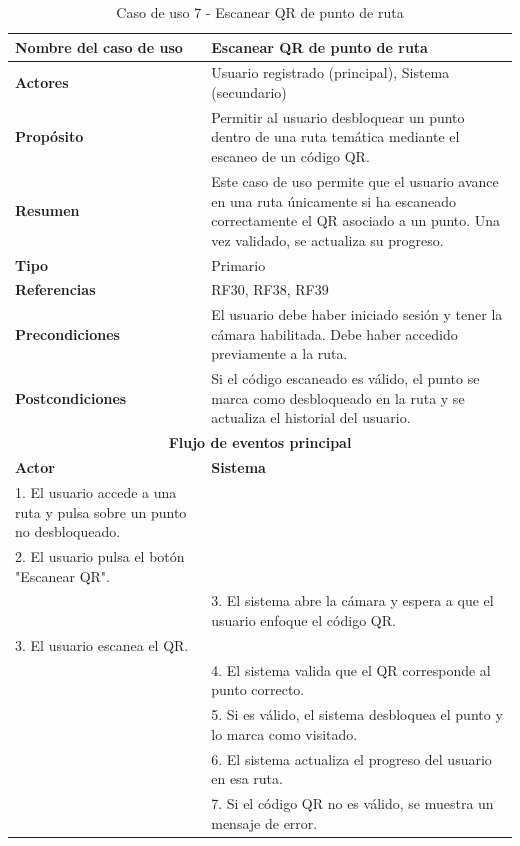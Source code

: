 \begin{table}[H]
\centering
\caption{Caso de uso 7 - Escanear QR de punto de ruta}
\begin{tabular}{|p{4.5cm}|p{10.5cm}|}
\hline
\textbf{Nombre del caso de uso} & Escanear QR de punto de ruta \\
\hline
\textbf{Actores} & Usuario registrado (principal), Sistema (secundario) \\
\hline
\textbf{Propósito} & Permitir al usuario desbloquear un punto dentro de una ruta temática mediante el escaneo de un código QR. \\
\hline
\textbf{Resumen} & Este caso de uso permite que el usuario avance en una ruta únicamente si ha escaneado correctamente el QR asociado a un punto. Una vez validado, se actualiza su progreso. \\
\hline
\textbf{Tipo} & Primario \\
\hline
\textbf{Referencias} & RF30, RF38, RF39 \\
\hline
\textbf{Precondiciones} & El usuario debe haber iniciado sesión y tener la cámara habilitada. Debe haber accedido previamente a la ruta. \\
\hline
\textbf{Postcondiciones} & Si el código escaneado es válido, el punto se marca como desbloqueado en la ruta y se actualiza el historial del usuario. \\
\hline
\multicolumn{2}{|c|}{\textbf{Flujo de eventos principal}} \\
\hline
\textbf{Actor} & \textbf{Sistema} \\
\hline
1. El usuario accede a una ruta y pulsa sobre un punto no desbloqueado. & \\
\hline
2. El usuario pulsa el botón "Escanear QR". & \\
\hline
& 3. El sistema abre la cámara y espera a que el usuario enfoque el código QR. \\
\hline
3. El usuario escanea el QR. & \\
\hline
& 4. El sistema valida que el QR corresponde al punto correcto. \\
\hline
& 5. Si es válido, el sistema desbloquea el punto y lo marca como visitado. \\
\hline
& 6. El sistema actualiza el progreso del usuario en esa ruta. \\
\hline
& 7. Si el código QR no es válido, se muestra un mensaje de error. \\
\hline
\end{tabular}
\end{table}

